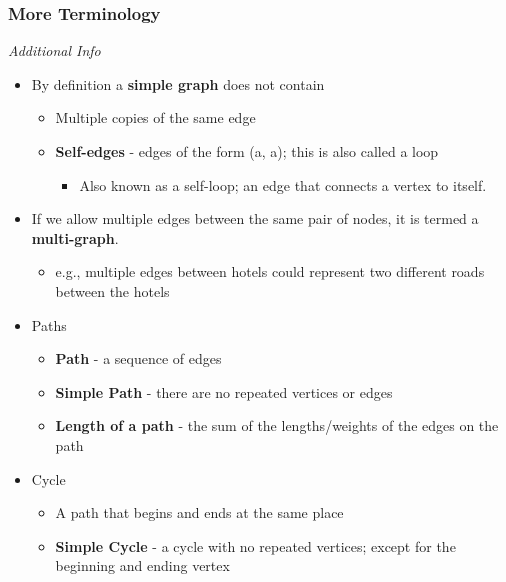 \documentclass[10pt]{article}
\begin{document}
\subsubsection{More Terminology}
\textit{Additional Info}
\begin{itemize}
    \item By definition a \textbf{simple graph} does not contain
          \begin{itemize}
              \item Multiple copies of the same edge
              \item \textbf{Self-edges} - edges of the form (a, a); this is also called a loop
                    \begin{itemize}
                        \item Also known as a self-loop; an edge that connects a vertex to itself.
                    \end{itemize}
          \end{itemize}
    \item If we allow multiple edges between the same pair of nodes, it is termed a \textbf{multi-graph}.
          \begin{itemize}
              \item e.g., multiple edges between hotels could represent two different roads between the hotels
          \end{itemize}
    \item Paths
          \begin{itemize}
              \item \textbf{Path } - a sequence of edges
              \item \textbf{Simple Path} - there are no repeated vertices or edges
              \item \textbf{Length of a path} - the sum of the lengths/weights of the edges on the path
          \end{itemize}
    \item Cycle
          \begin{itemize}
              \item A path that begins and ends at the same place
              \item \textbf{Simple Cycle} - a cycle with no repeated vertices; except for the beginning and ending vertex
          \end{itemize}
\end{itemize}
\newpage
\end{document}
